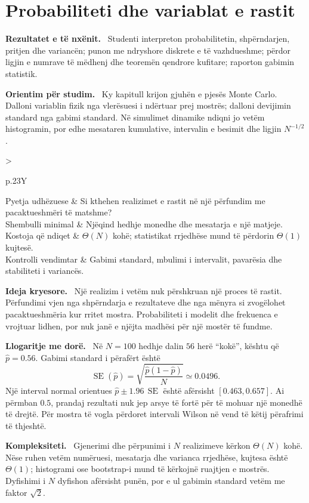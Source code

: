 \documentclass[11pt,oneside,openany]{book}
\newenvironment{qellime}{\par\medskip\noindent\textbf{Rezultatet e të nxënit.}\ }{\par\medskip}
\newenvironment{orientim}{\par\medskip\noindent\textbf{Orientim për studim.}\ }{\par\medskip}
\newenvironment{ideja}{\par\medskip\noindent\textbf{Ideja kryesore.}\ }{\par\medskip}
\newenvironment{llogaritjedore}{\par\medskip\noindent\textbf{Llogaritje me dorë.}\ }{\par\medskip}
\newenvironment{kompleksitet}{\par\medskip\noindent\textbf{Kompleksiteti.}\ }{\par\medskip}
\newcommand{\hartakapitullit}[4]{%
\par\smallskip
\noindent\begin{tabularx}{\textwidth}{>{\bfseries\raggedright\arraybackslash}p{.23\textwidth}Y}
Pyetja udhëzuese & #1\\
Shembulli minimal & #2\\
Kostoja që ndiqet & #3\\
Kontrolli vendimtar & #4
\end{tabularx}\par\medskip}
\begin{document}
\chapter{Probabiliteti dhe variablat e rastit}
\begin{qellime}
Studenti interpreton probabilitetin, shpërndarjen, pritjen dhe variancën; punon me ndryshore diskrete e të vazhdueshme; përdor ligjin e numrave të mëdhenj dhe teoremën qendrore kufitare; raporton gabimin statistik.
\end{qellime}

\begin{orientim}
Ky kapitull krijon gjuhën e pjesës Monte Carlo. Dalloni variablin fizik nga
vlerësuesi i ndërtuar prej mostrës; dalloni devijimin standard nga gabimi
standard. Në simulimet dinamike ndiqni jo vetëm histogramin, por edhe
mesataren kumulative, intervalin e besimit dhe ligjin $N^{-1/2}$.
\end{orientim}

\hartakapitullit
{Si kthehen realizimet e rastit në një përfundim me pacaktueshmëri të matshme?}
{Njëqind hedhje monedhe dhe mesatarja e një matjeje.}
{$\Theta(N)$ kohë; statistikat rrjedhëse mund të përdorin $\Theta(1)$ kujtesë.}
{Gabimi standard, mbulimi i intervalit, pavarësia dhe stabiliteti i variancës.}

\begin{ideja}
Një realizim i vetëm nuk përshkruan një proces të rastit. Përfundimi vjen nga
shpërndarja e rezultateve dhe nga mënyra si zvogëlohet pacaktueshmëria kur
rritet mostra. Probabiliteti i modelit dhe frekuenca e vrojtuar lidhen, por
nuk janë e njëjta madhësi për një mostër të fundme.
\end{ideja}

\begin{llogaritjedore}
Në $N=100$ hedhje dalin $56$ herë ``kokë'', kështu që
$\widehat p=0.56$. Gabimi standard i përafërt është
\begin{equation}
 \operatorname{SE}(\widehat p)=
 \sqrt{\frac{\widehat p(1-\widehat p)}{N}}\simeq0.0496.
\end{equation}
Një interval normal orientues $\widehat p\pm1.96\,\operatorname{SE}$ është
afërsisht $[0.463,0.657]$. Ai përmban $0.5$, prandaj rezultati nuk jep arsye
të fortë për të mohuar një monedhë të drejtë. Për mostra të vogla përdoret
intervali Wilson në vend të këtij përafrimi të thjeshtë.
\end{llogaritjedore}

\begin{kompleksitet}
Gjenerimi dhe përpunimi i $N$ realizimeve kërkon $\Theta(N)$ kohë. Nëse
ruhen vetëm numëruesi, mesatarja dhe varianca rrjedhëse, kujtesa është
$\Theta(1)$; histogrami ose bootstrap-i mund të kërkojnë ruajtjen e mostrës.
Dyfishimi i $N$ dyfishon afërsisht punën, por e ul gabimin standard vetëm me
faktor $\sqrt2$.
\end{kompleksitet}
\end{document}
